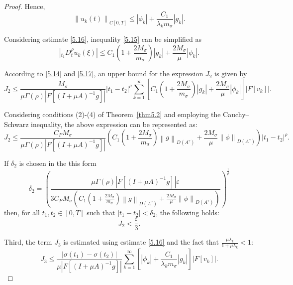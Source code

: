 \documentclass[reqno]{amsart}
\theoremstyle{definition}
\numberwithin{equation}{section}
\begin{document}
\begin{proof}
Hence,
\begin{equation} \label{5.16}
{{\left\| {{u}_{k}}(t) \right\|}_{C[0,T]}}\le \left| {{\phi }_{k}} \right|+\frac{{{C}_{1}}}{{{\lambda }_{k}}{{m}_{\sigma }}}\left| {{g}_{k}} \right|. 
\end{equation}

Considering estimate \eqref{5.16}, inequality \eqref{5.15} can be simplified as
\begin{equation}\label{5.17}
\left| _{{{t}_{1}}}D_{t}^{\rho }{{u}_{k}}(\xi ) \right| \leq {{C}_{1}}\left( 1+\frac{2{{M}_{\sigma }}}{{{m}_{\sigma }}} \right)\left| {{g}_{k}} \right|+\frac{2{{M}_{\sigma }}}{\mu }\left| {{\phi }_{k}} \right|.
\end{equation}

According to \eqref{5.14} and \eqref{5.17}, an upper bound for the expression $J_2$ is given by
$$
{{J}_{2}}\le \frac{{{M}_{\sigma }}}{\mu \Gamma (\rho )\left| F[{{(I+\mu A)}^{-1}}g] \right|}{{\left| {{t}_{1}}-{{t}_{2}} \right|}^{\rho }}\sum\limits_{k=1}^{\infty }{\left[ {{C}_{1}}\left( 1+\frac{2{{M}_{\sigma }}}{{{m}_{\sigma }}} \right)\left| {{g}_{k}} \right|+\frac{2{{M}_{\sigma }}}{\mu }\left| {{\phi }_{k}} \right| \right]\left| F\left[ {{v}_{k}} \right] \right|}.
$$

Considering conditions (2)-(4) of Theorem~\ref{thm5.2} and employing the Cauchy–Schwarz inequality, the above expression can be represented as:
$$
{{J}_{2}}\le \frac{{{C}_{F}}{{M}_{\sigma }}}{\mu \Gamma (\rho )\left| F[{{(I+\mu A)}^{-1}}g] \right|}\left( {{C}_{1}}\left( 1+\frac{2{{M}_{\sigma }}}{{{m}_{\sigma }}} \right){{\left\| g \right\|}_{D(A^{\gamma })}}+\frac{2{{M}_{\sigma }}}{\mu }{{\left\| \phi  \right\|}_{D(A^{\gamma })}} \right){{\left| {{t}_{1}}-{{t}_{2}} \right|}^{\rho }}.
$$

If $\delta_2$ is chosen in the this form 
$$
{{\delta }_{2}}={{\left( \frac{\mu \Gamma (\rho )\left| F[{{(I+\mu A)}^{-1}}g] \right|\varepsilon }{3{{C}_{F}}{{M}_{\sigma }}\left( {{C}_{1}}\left( 1+\frac{2{{M}_{\sigma }}}{{{m}_{\sigma }}} \right){{\left\| g \right\|}_{D(A^{\gamma })}}+\frac{2{{M}_{\sigma }}}{\mu }{{\left\| \phi  \right\|}_{D(A^{\gamma })}} \right)} \right)}^{\frac{1}{\rho }}}
$$
then, for all $t_1, t_2 \in [0,T]$ such that $|t_1 - t_2| < \delta_2$, the following holds:
\begin{equation}\label{5.18}
   J_2 <\frac{\varepsilon}{3}. 
\end{equation}

Third, the term $J_3$ is estimated using estimate \eqref{5.16} and the fact that $\frac{\mu \lambda_k}{1+\mu \lambda_k} < 1$:
$$
{{J}_{3}}\le \frac{\left| \sigma \left( {{t}_{1}} \right)-\sigma \left( {{t}_{2}} \right) \right|}{\mu \left| F[{{(I+\mu A)}^{-1}}g] \right|}\sum\limits_{k=1}^{\infty }{\left[ \left| {{\phi }_{k}} \right|+\frac{{{C}_{1}}}{{{\lambda }_{k}}{{m}_{\sigma }}}\left| {{g}_{k}} \right| \right]\left| F\left[ {{v}_{k}} \right] \right|}.
$$


\end{proof}
\end{document}
